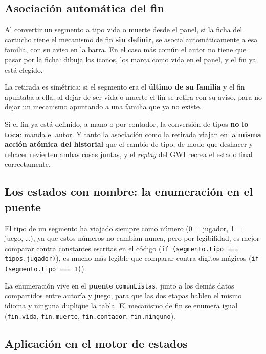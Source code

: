 \subsection{Asociación automática del fin}
\label{subsec:AsociacionFinF3I11}

Al convertir un segmento a tipo vida o muerte desde el panel, si la ficha del
cartucho tiene el mecanismo de fin \textbf{sin definir}, se asocia
automáticamente a esa familia, con su aviso en la barra. En el caso más común
el autor no tiene que pasar por la ficha: dibuja los iconos, los marca como
vida en el panel, y el fin ya está elegido.

La retirada es simétrica: si el segmento era el \textbf{último de su familia} y
el fin apuntaba a ella, al dejar de ser vida o muerte el fin se retira con su
aviso, para no dejar un mecanismo apuntando a una familia que ya no existe.

Si el fin ya está definido, a mano o por contador, la conversión de tipos
\textbf{no lo toca}: manda el autor. Y tanto la asociación como la retirada
viajan en la \textbf{misma acción atómica del historial} que el cambio de
tipo, de modo que deshacer y rehacer revierten ambas cosas juntas, y el
\emph{replay} del GWI recrea el estado final correctamente.

\subsection{Los estados con nombre: la enumeración en el puente}
\label{subsec:EnumeracionF3I11}

El tipo de un segmento ha viajado siempre como número (0 = jugador, 1 = juego,
\dots), ya que estos números no cambian nunca, pero por legibilidad, es mejor comparar contra constantes escritas en el código (\texttt{if (segmento.tipo === tipos.jugador)}), es mucho más
legible que comparar contra dígitos mágicos (\texttt{if (segmento.tipo === 1)}).

La enumeración vive en el \textbf{puente} \texttt{comunListas}, junto a los demás datos compartidos entre autoría y juego, para que las dos etapas hablen el mismo idioma y ninguna duplique la tabla. El mecanismo de fin se enumera igual (\texttt{fin.vida}, \texttt{fin.muerte}, \texttt{fin.contador}, \texttt{fin.ninguno}).

\subsection{Aplicación en el motor de estados}
\label{subsec:MotorFinF3I11}

